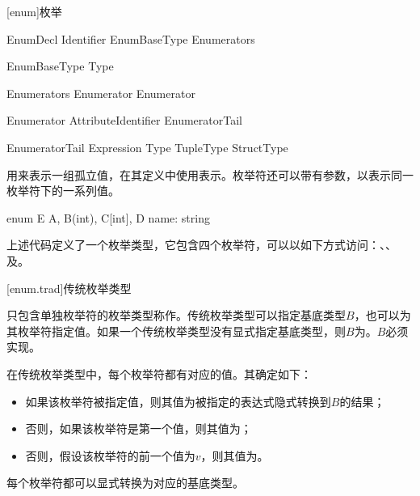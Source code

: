 
[enum]{枚举}

\begin{bnf}{EnumDecl}
     Identifier EnumBaseType\bnfq \terminal{\{} Enumerators \terminal{\}}
\end{bnf}

\begin{bnf}{EnumBaseType}
    \terminal{:} Type
\end{bnf}

\begin{bnf}{Enumerators}
    Enumerator \bnflp \terminal{,} Enumerator \bnfrp\bnfs \terminal{,}\bnfq
\end{bnf}

\begin{bnf}{Enumerator}
    Attribute\bnfq Identifier EnumeratorTail\bnfq
\end{bnf}

\begin{bnf}{EnumeratorTail}
    \terminal{=} Expression \br
    \terminal{[} Type \terminal{]} \br
    TupleType \br
    StructType
\end{bnf}

\pnum
{}用来表示一组孤立值，在其定义中使用表示。枚举符还可以带有参数，以表示同一枚举符下的一系列值。

\enterexample
\begin{codeblock}

enum E {
    A,
    B(int),
    C[int],
    D{ name: string }
}

\end{codeblock}

上述代码定义了一个枚举类型，它包含四个枚举符，可以以如下方式访问：、、及。
\exitexample

[enum.trad]{传统枚举类型}

\pnum
只包含单独枚举符的枚举类型称作。传统枚举类型可以指定基底类型$B$，也可以为其枚举符指定值。如果一个传统枚举类型没有显式指定基底类型，则$B$为。$B$必须实现。

\pnum
在传统枚举类型中，每个枚举符都有对应的值。其确定如下：

\begin{itemize}
    \item 如果该枚举符被指定值，则其值为被指定的表达式隐式转换到$B$的结果；
    \item 否则，如果该枚举符是第一个值，则其值为；
    \item 否则，假设该枚举符的前一个值为$v$，则其值为。
\end{itemize}

每个枚举符都可以显式转换为对应的基底类型。